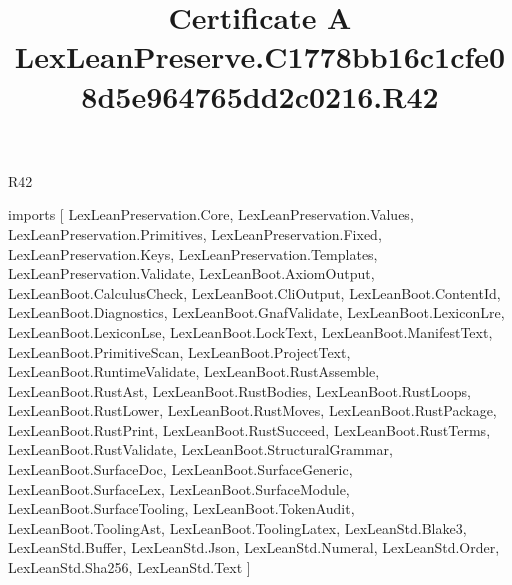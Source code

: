\begin{lexlean}{R42}
\title{Certificate A LexLeanPreserve.C1778bb16c1cfe08d5e964765dd2c0216.R42}
\begin{coremodule}
imports [
  LexLeanPreservation.Core,
  LexLeanPreservation.Values,
  LexLeanPreservation.Primitives,
  LexLeanPreservation.Fixed,
  LexLeanPreservation.Keys,
  LexLeanPreservation.Templates,
  LexLeanPreservation.Validate,
  LexLeanBoot.AxiomOutput,
  LexLeanBoot.CalculusCheck,
  LexLeanBoot.CliOutput,
  LexLeanBoot.ContentId,
  LexLeanBoot.Diagnostics,
  LexLeanBoot.GnafValidate,
  LexLeanBoot.LexiconLre,
  LexLeanBoot.LexiconLse,
  LexLeanBoot.LockText,
  LexLeanBoot.ManifestText,
  LexLeanBoot.PrimitiveScan,
  LexLeanBoot.ProjectText,
  LexLeanBoot.RuntimeValidate,
  LexLeanBoot.RustAssemble,
  LexLeanBoot.RustAst,
  LexLeanBoot.RustBodies,
  LexLeanBoot.RustLoops,
  LexLeanBoot.RustLower,
  LexLeanBoot.RustMoves,
  LexLeanBoot.RustPackage,
  LexLeanBoot.RustPrint,
  LexLeanBoot.RustSucceed,
  LexLeanBoot.RustTerms,
  LexLeanBoot.RustValidate,
  LexLeanBoot.StructuralGrammar,
  LexLeanBoot.SurfaceDoc,
  LexLeanBoot.SurfaceGeneric,
  LexLeanBoot.SurfaceLex,
  LexLeanBoot.SurfaceModule,
  LexLeanBoot.SurfaceTooling,
  LexLeanBoot.TokenAudit,
  LexLeanBoot.ToolingAst,
  LexLeanBoot.ToolingLatex,
  LexLeanStd.Blake3,
  LexLeanStd.Buffer,
  LexLeanStd.Json,
  LexLeanStd.Numeral,
  LexLeanStd.Order,
  LexLeanStd.Sha256,
  LexLeanStd.Text
]


\end{coremodule}
\end{lexlean}
